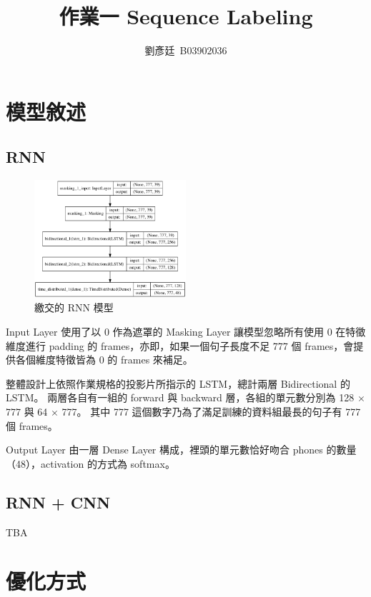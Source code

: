 \documentclass[final,3p]{elsarticle}
\begin{document}
\begin{frontmatter}

\title{作業一 Sequence Labeling}

\author{劉彥廷~B03902036}

\end{frontmatter}


\section{模型敘述}	
	
	\subsection{RNN}
		\begin{figure}[H]
			\centering
			\includegraphics[width=0.5\textwidth]{images/rnn_mfcc}
			\caption{繳交的 RNN 模型} \label{fig:rnn}
		\end{figure}
		Input Layer 使用了以 0 作為遮罩的 Masking Layer 讓模型忽略所有使用 0 在特徵維度進行 padding 的 frames，亦即，如果一個句子長度不足 777 個 frames，會提供各個維度特徵皆為 0 的 frames 來補足。
		
		整體設計上依照作業規格的投影片所指示的 LSTM，總計兩層 Bidirectional 的 LSTM。
		兩層各自有一組的 forward 與 backward 層，各組的單元數分別為 128 $\times$ 777 與 64 $\times$ 777。
		其中 777 這個數字乃為了滿足訓練的資料組最長的句子有 777 個 frames。
		
		Output Layer 由一層 Dense Layer 構成，裡頭的單元數恰好吻合 phones 的數量（48），activation 的方式為 softmax。
		
	\subsection{RNN + CNN}
		TBA
		
\section{優化方式}
\end{document}
